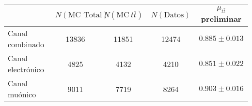 \begin{tabular}{lcccc}
\toprule
                  & $N(\text{MC Total})$ & $N(\text{MC} \ t\bar{t})$ & $N(\text{Datos})$ & $\mu_{t\bar{t}}$ preliminar   \\
\midrule
Canal combinado   & 13836                & 11851                     & 12474             & $0.885 \pm 0.013$             \\
Canal electrónico & 4825                 & 4132                      & 4210              & $0.851 \pm 0.022$             \\
Canal muónico     & 9011                 & 7719                      & 8264              & $0.903 \pm 0.016$             \\
\bottomrule
\end{tabular}